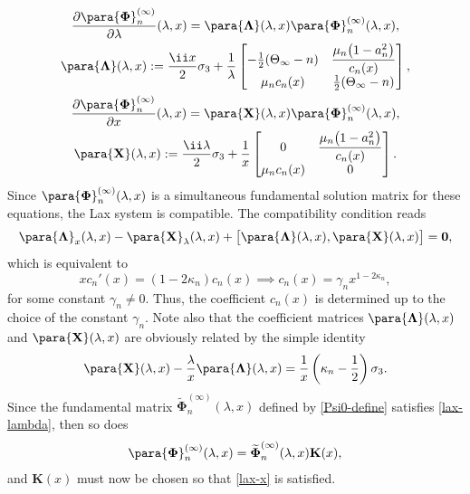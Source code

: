 \begin{gather}
 \frac{\partial\para{\boldsymbol \Phi}_{n}^{(\infty)}}{\partial\lambda}(\lambda,x) =\para{\boldsymbol\Lambda}(\lambda,x) \para{\boldsymbol \Phi}_n^{(\infty)}(\lambda,x),\nonumber\\
 \para{\mathbf{\Lambda}}(\lambda,x):=\dfrac{\ii x}{2} \sigma_3 + \dfrac{1}{\lambda}\begin{bmatrix} -\frac{1}{2}(\Theta_\infty -n) & \displaystyle \frac{\mu_n\big(1-a_n^2\big)}{c_n(x)} \\ \mu_n c_n(x) & \frac{1}{2}(\Theta_\infty-n) \end{bmatrix}, \label{lax-lambda} \\
 \frac{\partial\para{\boldsymbol \Phi}_{n}^{(\infty)}}{\partial x}(\lambda,x) =\para{\mathbf X}(\lambda,x) \para{\boldsymbol \Phi}_n^{(\infty)}(\lambda,x),\nonumber\\
 \para{\mathbf{X}}(\lambda,x):= \dfrac{\ii\lambda}{2} \sigma_3 + \dfrac{1}{x}\begin{bmatrix} 0 & \displaystyle \frac{\mu_n\big(1-a_n^2\big)}{c_n(x)} \\ \mu_n c_n(x) & 0 \end{bmatrix}. \label{lax-x}
\end{gather}
Since $\para{\boldsymbol\Phi}_n^{(\infty)}(\lambda,x)$ is a simultaneous fundamental solution matrix for these equations, the Lax system is compatible. The compatibility condition reads
\begin{equation*}
 \para{\boldsymbol\Lambda}_{x}(\lambda,x) - \para{\mathbf X}_{\lambda}(\lambda,x) + \big[\para{\boldsymbol{\Lambda}}(\lambda,x), \para{\mathbf X}(\lambda,x)\big] = \mathbf{0},
\end{equation*}
which is equivalent to
\begin{equation}
 xc_n'(x) = (1-2\kappa_n) c_n(x) \implies c_n(x) = \gamma_n x^{1-2\kappa_n},
 \label{c-of-x}
\end{equation}
for some constant $\gamma_n\neq 0$. Thus, the coefficient $c_n(x)$ is determined up to the choice of the constant $\gamma_n$. Note also that the coefficient matrices $\para{\boldsymbol{\Lambda}}(\lambda,x)$ and $\para{\mathbf{X}}(\lambda,x)$ are obviously related by the simple identity
\begin{equation}
 \para{\mathbf{X}}(\lambda,x)-\frac{\lambda}{x}\para{\boldsymbol\Lambda}(\lambda,x)=\frac{1}{x}\left(\kappa_n-\frac{1}{2}\right)\sigma_3.
 \label{XLambda-relation}
\end{equation}
\sloppy Since the fundamental matrix $\widetilde{\boldsymbol \Phi}_n^{(\infty)}(\lambda,x)$ defined by \eqref{Psi0-define} satisfies \eqref{lax-lambda}, then so does \[\para{\boldsymbol \Phi}_n^{(\infty)}(\lambda,x)=\widetilde{\boldsymbol\Phi}_n^{(\infty)}(\lambda,x) \mathbf K(x),\] and $\mathbf K(x)$ must now be chosen so that \eqref{lax-x} is satisfied.
